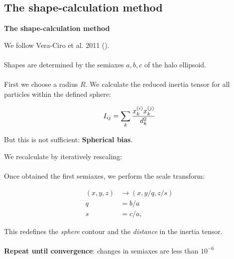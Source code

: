 \documentclass[xcolor=dvipsnames]{beamer}
\begin{document}
\subsection{The shape-calculation method}
\begin{frame}
\centering
\LARGE
\textbf{The shape-calculation method}
\normalsize
\end{frame}

\begin{frame}
\footnotesize
We follow Vera-Ciro et al. 2011 (\cite[Allgood et al. 2006]{Allgood2006}).\\~\\

Shapes are determined by the semiaxes $a,b,c$ of the halo ellipsoid.\\~\\

First we choose a radius $R$. We calculate the reduced inertia tensor for all particles within the defined sphere:

\begin{equation}
\Large
I_{ij} = \sum_k \frac{x_k^{(i)}x_k^{(j)}}{d^2_k}
\end{equation}

But this is not sufficient: \textbf{Spherical bias}.

\end{frame}


\begin{frame}
\small

We recalculate by iteratively rescaling:\\~\\

Once obtained the first semiaxes, we perform the scale transform:

\begin{align}
(x,y,z) &\rightarrow (x,y/q,z/s) \\
q &=  b/a\\
s &= c/a,
\end{align}

This redefines the \textit{sphere} contour and the \textit{distance} in the inertia tensor.\\~\\

\textbf{Repeat until convergence}: changes in semiaxes are less than $10^{-6}$


\end{frame}
\end{document}
